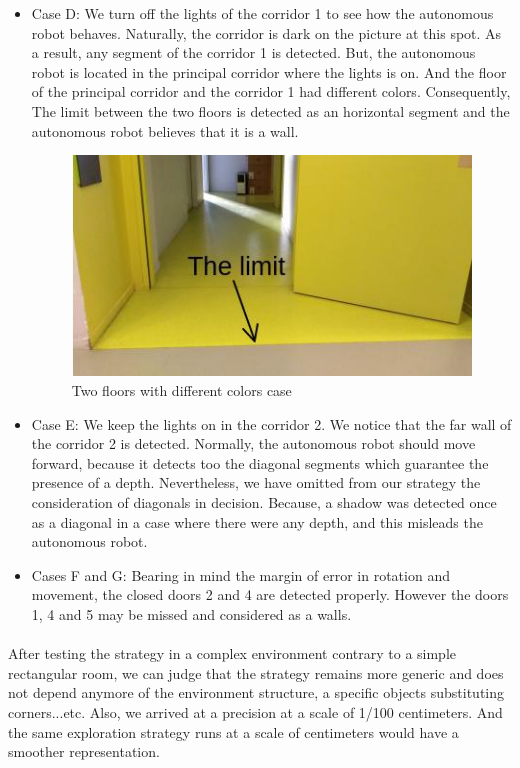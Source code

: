 \documentclass[12pt]{report}
\begin{document}
\begin{itemize}
		\item Case D: We turn off the lights of the corridor 1 to see how the autonomous robot behaves. Naturally, the corridor is dark on the picture at this spot. As a result, any segment of the corridor 1 is detected. But, the autonomous robot is located in the principal corridor where the lights is on. And the floor of the principal corridor and the corridor 1 had different colors. Consequently, The limit between the two floors is detected as an horizontal segment and the autonomous robot believes that it is a wall.
		\begin{figure}[H]
			\begin{center}
				\includegraphics[scale=0.80]{res/limit_cor.jpg}
				\caption{Two floors with different colors case}
			\end{center}
		\end{figure}
	\item Case E: We keep the lights on in the corridor 2. We notice that the far wall of the corridor 2 is detected. Normally, the autonomous robot should move forward, because it detects too the diagonal segments which guarantee the presence of a depth. Nevertheless, we have omitted from our strategy the consideration of diagonals in decision. Because, a shadow was detected once as a diagonal in a case where there were any depth, and this misleads the autonomous robot.
	
	\item Cases F and G: Bearing in mind the margin of error in rotation and movement, the closed doors 2 and 4 are detected properly. However the doors 1, 4 and 5 may be missed and considered as a walls.
	\end{itemize}

	\paragraph{}
	After testing the strategy in a complex environment contrary to a simple rectangular room, we can judge that the strategy remains more generic and does not depend anymore of the environment structure, a specific objects substituting corners...etc. Also, we arrived at a precision at a scale of 1/100 centimeters. And the same exploration strategy runs at a scale of centimeters would have a smoother representation.
	
\end{document}
